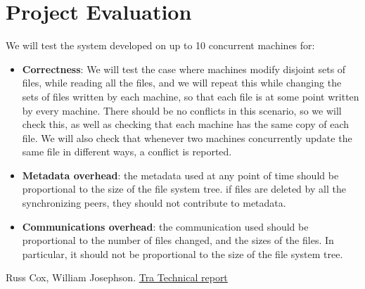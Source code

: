 \section{Project Evaluation}
We will test the system developed on up to 10 concurrent machines for:
\begin{itemize}\renewcommand{\labelitemi}{$\diamond$}
\item {\bf Correctness}: We will test the case where machines modify disjoint sets of files, while reading all the files, and we will repeat this while changing the sets of files written by each machine, so that each file is at some point written by every machine.  There should be no conflicts in this scenario, so we will check this, as well as checking that each machine has the same copy of each file.  We will also check that whenever two machines concurrently update the same file in different ways, a conflict is reported.

\item {\bf Metadata overhead}: the metadata used at any point of time should be proportional to the size of the file system tree. if files are deleted by all the synchronizing peers, they should not contribute to metadata.

\item {\bf Communications overhead}: the communication used should be proportional to the number of files changed, and the sizes of the files. In particular, it should not be proportional to the size of the file system tree.
\end{itemize}

\begin{thebibliography}{1}
\newblock Russ Cox, William Josephson.
\newblock \href{http://publications.csail.mit.edu/tmp/MIT-CSAIL-TR-2005-014.pdf}{Tra Technical report}
\end{thebibliography}

